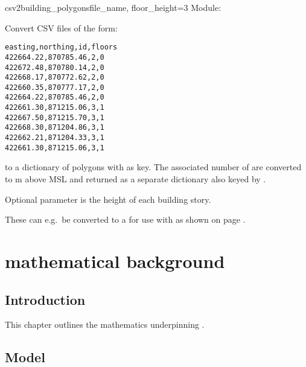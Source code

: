 \documentclass{manual}
\begin{document}
\begin{funcdesc}{csv2building\_polygons}{file\_name, floor\_height=3}
  Module: 

  Convert CSV files of the form:

  \begin{verbatim}
easting,northing,id,floors
422664.22,870785.46,2,0
422672.48,870780.14,2,0
422668.17,870772.62,2,0
422660.35,870777.17,2,0
422664.22,870785.46,2,0
422661.30,871215.06,3,1
422667.50,871215.70,3,1
422668.30,871204.86,3,1
422662.21,871204.33,3,1
422661.30,871215.06,3,1
  \end{verbatim}

  to a dictionary of polygons with  as key.
  The associated number of  are converted to m above MSL and
  returned as a separate dictionary also keyed by .

  Optional parameter  is the height of each building story.

  These can e.g.\ be converted to a  for use with 
  as shown on page \pageref{add quantity}.
\end{funcdesc}


\chapter{\anuga mathematical background}
\label{cd:mathematical background}


\section{Introduction}

This chapter outlines the mathematics underpinning \anuga.


\section{Model}
\label{sec:model}
\end{document}
